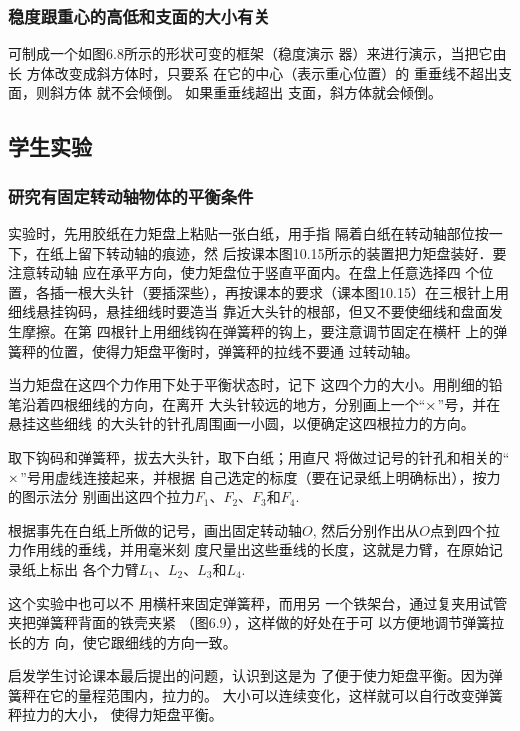 \subsubsection{稳度跟重心的高低和支面的大小有关}
可制成一个如图6.8所示的形状可变的框架（稳度演示
器）来进行演示，当把它由长
方体改变成斜方体时，只要系
在它的中心（表示重心位置）的
重垂线不超出支面，则斜方体
就不会倾倒。
如果重垂线超出
支面，斜方体就会倾倒。

\begin{figure}[htp]
    \centering
    \caption{}
\end{figure}

\subsection{学生实验}
\subsubsection{研究有固定转动轴物体的平衡条件}

实验时，先用胶纸在力矩盘上粘贴一张白纸，用手指
隔着白纸在转动轴部位按一下，在纸上留下转动轴的痕迹，然
后按课本图10.15所示的装置把力矩盘装好．要注意转动轴
应在承平方向，使力矩盘位于竖直平面内。在盘上任意选择四
个位置，各插一根大头针（要插深些），再按课本的要求（课本图10.15）在三根针上用细线悬挂钩码，悬挂细线时要造当
靠近大头针的根部，但又不要使细线和盘面发生摩擦。在第
四根针上用细线钩在弹簧秤的钩上，要注意调节固定在横杆
上的弹簧秤的位置，使得力矩盘平衡时，弹簧秤的拉线不要通
过转动轴。

当力矩盘在这四个力作用下处于平衡状态时，记下
这四个力的大小。用削细的铅笔沿着四根细线的方向，在离开
大头针较远的地方，分别画上一个“$\times$”号，并在悬挂这些细线
的大头针的针孔周围画一小圆，以便确定这四根拉力的方向。

取下钩码和弹簧秤，拔去大头针，取下白纸；用直尺
将做过记号的针孔和相关的“$\times$”号用虚线连接起来，并根据
自己选定的标度（要在记录纸上明确标出），按力的图示法分
别画出这四个拉力$F_1$、$F_2$、$F_3$和$F_4$.

根据事先在白纸上所做的记号，画出固定转动轴$O$,
然后分别作出从$O$点到四个拉力作用线的垂线，并用毫米刻
度尺量出这些垂线的长度，这就是力臂，在原始记录纸上标出
各个力臂$L_1$、$L_2$、$L_3$和$L_4$.

这个实验中也可以不
用横杆来固定弹簧秤，而用另
一个铁架台，通过复夹用试管
夹把弹簧秤背面的铁壳夹紧
（图6.9），这样做的好处在于可
以方便地调节弹簧拉长的方
向，使它跟细线的方向一致。

启发学生讨论课本最后提出的问题，认识到这是为
了便于使力矩盘平衡。因为弹簧秤在它的量程范围内，拉力的。
大小可以连续变化，这样就可以自行改变弹簧秤拉力的大小，
使得力矩盘平衡。

